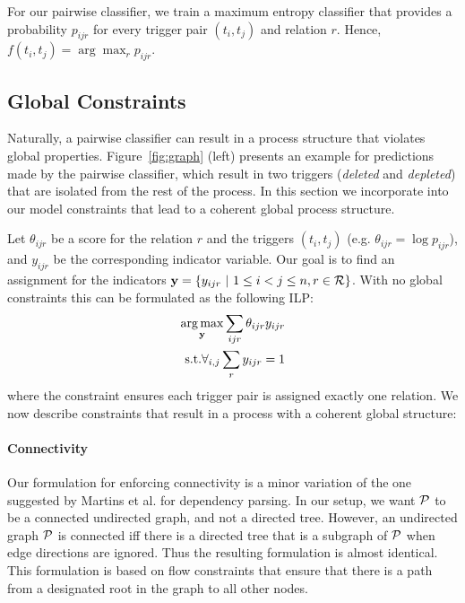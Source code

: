 For our pairwise classifier, we train a maximum entropy classifier that provides a probability $p_{ijr}$ for every trigger pair $(t_i,t_j)$ and relation $r$. Hence, $f(t_i,t_j)= \arg\max_r p_{ijr}$.

\subsection{Global Constraints} \label{subsec:global}

Naturally, a pairwise classifier can result in a process structure that violates global properties. Figure~\ref{fig:graph} (left) presents an example for predictions made by the pairwise classifier, which result in two triggers (\emph{deleted} and \emph{depleted}) that are isolated from the rest of the process. In this section we incorporate into our model constraints that lead to a coherent global process structure.

Let $\theta_{ijr}$ be a score for the relation $r$ and the triggers $(t_i,t_j)$ (e.g. $\theta_{ijr}=\log p_{ijr}$), and $y_{ijr}$ be the corresponding indicator variable. Our goal is to find an assignment for the indicators $\by=\{y_{ijr} \ | \ 1 \leq i < j \leq n, r \in \sR \}$. With no global constraints this can be formulated as the following ILP:
\begin{align}
\vspace{-3mm}
\argmax_{\by} \sum_{ijr} \theta_{ijr} y_{ijr} \\
\mbox{s.t.} \forall_{i,j} \sum_r y_{ijr}=1 \nonumber
\vspace{-3mm}
\end{align}
\noindent where the constraint ensures each trigger pair is assigned exactly one relation. We now describe constraints that result in a process with a coherent global structure:

\paragraph{Connectivity} 
Our formulation for enforcing connectivity is a minor variation of the one suggested by Martins et al.  for dependency parsing. In our setup, we want $\mathcal{P}$ to be a connected undirected graph, and not a directed tree. However, an undirected graph $\mathcal{P}$ is connected iff there is a directed tree that is a subgraph of $\mathcal{P}$ when edge directions are ignored. Thus the resulting formulation is almost identical. This formulation is based on flow constraints that ensure that there is a path from a designated root in the graph to all other nodes.

